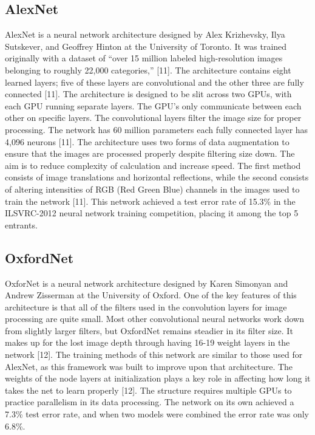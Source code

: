\documentclass{scrreprt}
\begin{document}
\subsection{AlexNet}
AlexNet is a neural network architecture designed by Alex Krizhevsky, Ilya Sutskever, and
Geoffrey Hinton at the University of Toronto. It was trained originally with a dataset of “over 15
million labeled high-resolution images belonging to roughly 22,000 categories,” [11]. The
architecture contains eight learned layers; five of these layers are convolutional and the other
three are fully connected [11]. The architecture is designed to be slit across two GPUs, with each
GPU running separate layers. The GPU’s only communicate between each other on specific
layers. The convolutional layers filter the image size for proper processing. The network has 60
million parameters each fully connected layer has 4,096 neurons [11]. The architecture uses two
forms of data augmentation to ensure that the images are processed properly despite filtering size
down. The aim is to reduce complexity of calculation and increase speed. The first method
consists of image translations and horizontal reflections, while the second consists of altering
intensities of RGB (Red Green Blue) channels in the images used to train the network [11]. This
network achieved a test error rate of 15.3\% in the ILSVRC-2012 neural network training
competition, placing it among the top 5 entrants.

\subsection{OxfordNet}
OxforNet is a neural network architecture designed by Karen Simonyan and Andrew Zisserman
at the University of Oxford. One of the key features of this architecture is that all of the filters
used in the convolution layers for image processing are quite small. Most other convolutional
neural networks work down from slightly larger filters, but OxfordNet remains steadier in its
filter size. It makes up for the lost image depth through having 16-19 weight layers in the
network [12]. The training methods of this network are similar to those used for AlexNet, as this
framework was built to improve upon that architecture. The weights of the node layers at
initialization plays a key role in affecting how long it takes the net to learn properly [12]. The
structure requires multiple GPUs to practice parallelism in its data processing. The network on
its own achieved a 7.3\% test error rate, and when two models were combined the error rate was
only 6.8\%.
\end{document}
